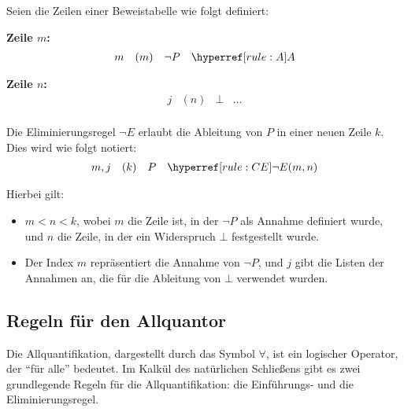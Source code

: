 \documentclass[main.tex]{subfiles}
\begin{document}
\begin{definition}
Seien die Zeilen einer Beweistabelle wie folgt definiert:

\textbf{Zeile \(m\):}
\[
\begin{array}{llll}
    m & (m) & \neg P & \rA \\
\end{array}
\]

\textbf{Zeile \(n\):}
\[
\begin{array}{llll}
    j & (n) & \bot & \dots \\
\end{array}
\]

Die Eliminierungsregel \(\neg E\) erlaubt die Ableitung von \(P\) in einer neuen Zeile \(k\). Dies wird wie folgt notiert:
\[
\begin{array}{llll}
    m, j & (k) & P & \rCE{m,n} \\
\end{array}
\]

Hierbei gilt:
\begin{itemize}
    \item \(m < n < k\), wobei \(m\) die Zeile ist, in der \(\neg P\) als Annahme definiert wurde, und \(n\) die Zeile, in der ein Widerspruch \(\bot\) festgestellt wurde.
    \item Der Index \(m\) repräsentiert die Annahme von \(\neg P\), und \(j\) gibt die Listen der Annahmen an, die für die Ableitung von \(\bot\) verwendet wurden.
\end{itemize}
\end{definition}

\subsection{Regeln für den Allquantor}

Die Allquantifikation, dargestellt durch das Symbol \(\forall\), ist ein logischer Operator, der \enquote{für alle} bedeutet. Im Kalkül des natürlichen Schließens gibt es zwei grundlegende Regeln für die Allquantifikation: die Einführungs- und die Eliminierungsregel.
\end{document}
